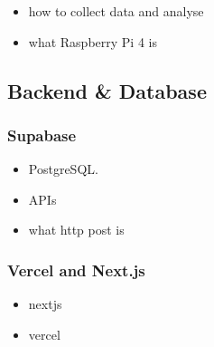\begin{itemize}
\item how to collect data and analyse
\item what Raspberry Pi 4 is
\end{itemize}




\subsection{Backend \& Database}
\subsubsection{Supabase}
\begin{itemize}  
	\item PostgreSQL. 
	\item APIs
	\item what http post is
\end{itemize}  

\subsubsection{Vercel and Next.js}
\begin{itemize}  
	\item nextjs 
	\item vercel
\end{itemize} 